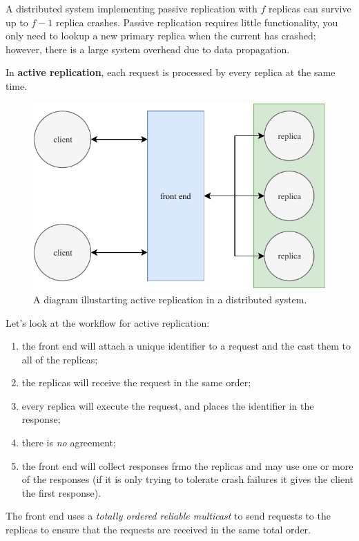 A distributed system implementing passive replication with $f$ replicas
can survive up to $f - 1$ replica crashes.
Passive replication requires little functionality, 
you only need to lookup a new primary replica when the current has crashed;
however, there is a large system overhead due to data propagation.

\begin{definition}
    In \textbf{active replication}, each request is processed by every replica
    at the same time.
\end{definition}

\begin{figure}[]
    \centering
    \includegraphics[width=0.8\linewidth]{images/active-replication.pdf}
    \caption{A diagram illustarting active replication in a distributed system.}%
    \label{fig:active-replication}
\end{figure}

Let's look at the workflow for active replication:
\begin{enumerate}
    \item the front end will attach a unique identifier to a request
        and the cast them to all of the replicas;
    \item the replicas will receive the request in the same order;
    \item every replica will execute the request, and places the identifier in
        the response;
    \item there is \emph{no} agreement;
    \item the front end will collect responses frmo the replicas and may use
        one or more of the responses
        (if it is only trying to tolerate crash failures it gives the client
        the first response).
\end{enumerate}
The front end uses a \emph{totally ordered reliable multicast} to send
requests to the replicas to ensure that the requests are received in the
same total order.

